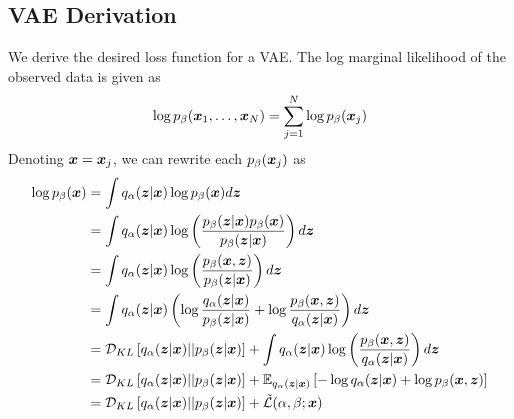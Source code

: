 \subsection{VAE Derivation}\label{sec:vae_derive}

We derive the desired loss function for a VAE. The log marginal likelihood of the observed data is given as
\begin{equation}
  \log p_{\beta}(\boldsymbol{x}_1,\ldots,\boldsymbol{x}_N) = \sum_{j=1}^N \log p_{\beta}(\boldsymbol{x}_j)
  \label{eq:vae_marginal}
\end{equation}
Denoting $\boldsymbol{x} = \boldsymbol{x}_j$, we can rewrite each $p_{\beta}(\boldsymbol{x}_j)$ as %
\begin{equation}
  \begin{split}
    \log p_{\beta}(\boldsymbol{x}) &= \int q_\alpha(\boldsymbol{z} |\boldsymbol{x}) \log p_{\beta} (\boldsymbol{x})d\boldsymbol{z} \\
    &= \int q_\alpha(\boldsymbol{z} | \boldsymbol{x}) \log \left( \frac{p_{\beta}(\boldsymbol{z} | \boldsymbol{x}) p_{\beta}(\boldsymbol{x})}{p_{\beta}(\boldsymbol{z} | \boldsymbol{x})} \right) d\boldsymbol{z}  \\
    &= \int q_\alpha(\boldsymbol{z} | \boldsymbol{x}) \log \left( \frac{p_{\beta}(\boldsymbol{x}, \boldsymbol{z})}{p_{\beta}(\boldsymbol{z} | \boldsymbol{x})} \right) d\boldsymbol{z}\\
    &= \int q_\alpha(\boldsymbol{z} | \boldsymbol{x}) \left( \log \frac{q_\alpha(\boldsymbol{z} | \boldsymbol{x})}{p_{\beta}(\boldsymbol{z} | \boldsymbol{x})} + \log \frac{p_{\beta}(\boldsymbol{x}, \boldsymbol{z})}{q_\alpha(\boldsymbol{z} | \boldsymbol{x})}\right) d\boldsymbol{z} \\
    &= \mathcal{D}_{KL}\left[ q_\alpha(\boldsymbol{z} |\boldsymbol{x}) || p_{\beta}(\boldsymbol{z} | \boldsymbol{x}) \right] + \int q_\alpha(\boldsymbol{z} | \boldsymbol{x}) \log \left( \frac{p_{\beta}(\boldsymbol{x}, \boldsymbol{z})}{q_\alpha(\boldsymbol{z} | \boldsymbol{x})} \right)d\boldsymbol{z} \\
    &= \mathcal{D}_{KL}\left[ q_\alpha(\boldsymbol{z} |\boldsymbol{x}) || p_{\beta}(\boldsymbol{z} | \boldsymbol{x}) \right] + \mathbb{E}_{q_\alpha(\boldsymbol{z} | \boldsymbol{x})}\left[ -\log q_\alpha(\boldsymbol{z} | \boldsymbol{x}) + \log p_{\beta}(\boldsymbol{x}, \boldsymbol{z}) \right] \\
    &= \mathcal{D}_{KL}\left[ q_\alpha(\boldsymbol{z} |\boldsymbol{x}) || p_{\beta}(\boldsymbol{z} | \boldsymbol{x}) \right] + \tilde{\mathcal{L}}(\alpha, \beta; \boldsymbol{x})
\label{eq:vae_derive}
  \end{split}
\end{equation}

